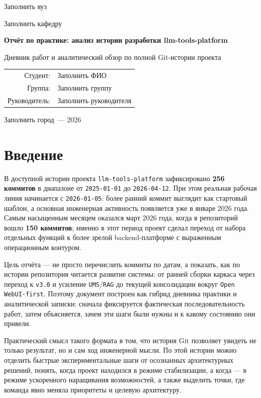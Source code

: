 \documentclass[12pt,a4paper]{article}
\newcommand{\ReportTitle}{Отчёт по практике: анализ истории разработки llm-tools-platform}
\newcommand{\ReportSubtitle}{Дневник работ и аналитический обзор по полной Git-истории проекта}
\newcommand{\ReportAuthor}{Заполнить ФИО}
\newcommand{\ReportGroup}{Заполнить группу}
\newcommand{\ReportSupervisor}{Заполнить руководителя}
\newcommand{\ReportUniversity}{Заполнить вуз}
\newcommand{\ReportDepartment}{Заполнить кафедру}
\newcommand{\ReportCity}{Заполнить город}
\newcommand{\ReportYear}{2026}
\begin{document}
\begin{titlepage}
\begin{center}
{\small \ReportUniversity \par}
{\small \ReportDepartment \par}
\vfill
{\Large \textbf{\ReportTitle} \par}
\vspace{0.8cm}
{\large \ReportSubtitle \par}
\vfill
\begin{flushright}
\begin{tabular}{rl}
Студент: & \ReportAuthor \\
Группа: & \ReportGroup \\
Руководитель: & \ReportSupervisor \\
\end{tabular}
\end{flushright}
\vfill
{\ReportCity\ --- \ReportYear \par}
\end{center}
\end{titlepage}

\tableofcontents
\newpage

\section{Введение}

В доступной истории проекта \texttt{llm-tools-platform} зафиксировано \textbf{256 коммитов} в диапазоне от \texttt{2025-01-01} до \texttt{2026-04-12}. При этом реальная рабочая линия начинается с \texttt{2026-01-05}: более ранний коммит выглядит как стартовый шаблон, а основная инженерная активность появляется уже в январе 2026 года. Самым насыщенным месяцем оказался март 2026 года, когда в репозиторий вошло \textbf{150 коммитов}; именно в этот период проект сделал переход от набора отдельных функций к более зрелой backend-платформе с выраженным операционным контуром.

Цель отчёта --- не просто перечислить коммиты по датам, а показать, как по истории репозитория читается развитие системы: от ранней сборки каркаса через переход к \texttt{v3.0} и усиление \texttt{UMS}/\texttt{RAG} до текущей консолидации вокруг \texttt{Open WebUI-first}. Поэтому документ построен как гибрид дневника практики и аналитической записки: сначала фиксируется фактическая последовательность работ, затем объясняется, зачем эти шаги были нужны и к какому состоянию они привели.

Практический смысл такого формата в том, что история Git позволяет увидеть не только результат, но и сам ход инженерной мысли. По этой истории можно отделить быстрые экспериментальные шаги от осознанных архитектурных решений, понять, когда проект находился в режиме стабилизации, а когда --- в режиме ускоренного наращивания возможностей, а также выделить точки, где команда явно меняла приоритеты и целевую архитектуру.
\end{document}
